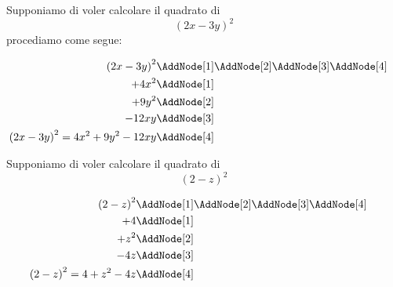 \begin{esempio}
Supponiamo di voler calcolare il quadrato di \[ \left(2x-3y\right)^2\]
procediamo come segue:
\begin{NodesList}
	\begin{align*}
		\left(2x-3y\right)^2&\AddNode[1]\AddNode[2]\AddNode[3]\AddNode[4]\\
		+4x^2&\AddNode[1]&\\ 
		+9y^2&\AddNode[2]&\\
		-12xy&\AddNode[3]\\
		\left(2x-3y\right)^2=4x^2+9y^2-12xy&\AddNode[4]
	\end{align*}
\end{NodesList}
\end{esempio}
\begin{esempio}
Supponiamo di voler calcolare il quadrato di \[\left(2-z\right)^2\]
\begin{NodesList}
	\begin{align*}
		\left(2-z\right)^2&\AddNode[1]\AddNode[2]\AddNode[3]\AddNode[4]\\
		+4&\AddNode[1]&\\ 
		+z^2&\AddNode[2]&\\
		-4z&\AddNode[3]\\
		\left(2-z\right)^2=4+z^2-4z&\AddNode[4]
	\end{align*}
\end{NodesList}
\end{esempio}
